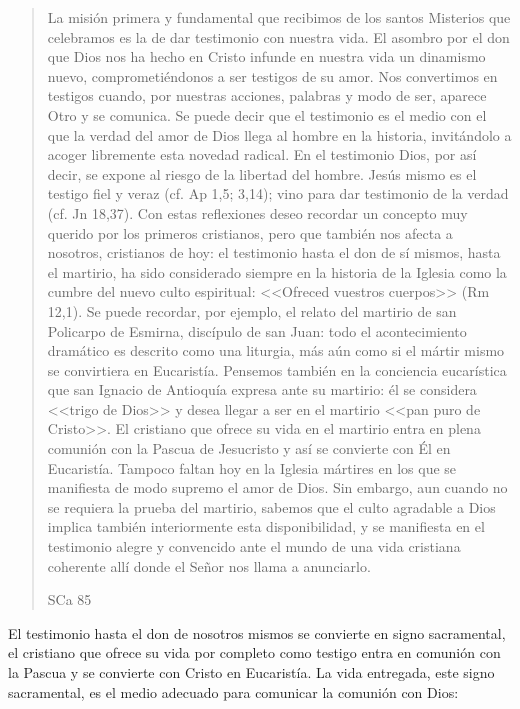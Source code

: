 \blockquote[SCa 85]{La misión primera y fundamental que recibimos de los santos
  Misterios que celebramos es la de dar testimonio con nuestra vida. El asombro
  por el don que Dios nos ha hecho en Cristo infunde en nuestra vida un
  dinamismo nuevo, comprometiéndonos a ser testigos de su amor. Nos convertimos
  en testigos cuando, por nuestras acciones, palabras y modo de ser, aparece
  Otro y se comunica. Se puede decir que el testimonio es el medio con el que la
  verdad del amor de Dios llega al hombre en la historia, invitándolo a acoger
  libremente esta novedad radical. En el testimonio Dios, por así decir, se
  expone al riesgo de la libertad del hombre. Jesús mismo es el testigo fiel y
  veraz (cf. Ap 1,5; 3,14); vino para dar testimonio de la verdad (cf. Jn
  18,37). Con estas reflexiones deseo recordar un concepto muy querido por los
  primeros cristianos, pero que también nos afecta a nosotros, cristianos de
  hoy: el testimonio hasta el don de sí mismos, hasta el martirio, ha sido
  considerado siempre en la historia de la Iglesia como la cumbre del nuevo
  culto espiritual: <<Ofreced vuestros cuerpos>> (Rm 12,1). Se puede recordar,
  por ejemplo, el relato del martirio de san Policarpo de Esmirna, discípulo de
  san Juan: todo el acontecimiento dramático es descrito como una liturgia, más
  aún como si el mártir mismo se convirtiera en Eucaristía. Pensemos también en
  la conciencia eucarística que san Ignacio de Antioquía expresa ante su
  martirio: él se considera <<trigo de Dios>> y desea llegar a ser en el
  martirio <<pan puro de Cristo>>. El cristiano que ofrece su vida en el
  martirio entra en plena comunión con la Pascua de Jesucristo y así se
  convierte con Él en Eucaristía. Tampoco faltan hoy en la Iglesia mártires en
  los que se manifiesta de modo supremo el amor de Dios. Sin embargo, aun cuando
  no se requiera la prueba del martirio, sabemos que el culto agradable a Dios
  implica también interiormente esta disponibilidad, y se manifiesta en el
  testimonio alegre y convencido ante el mundo de una vida cristiana coherente
  allí donde el Señor nos llama a anunciarlo.}
El testimonio hasta el don de nosotros mismos se convierte en signo sacramental,
el cristiano que ofrece su vida por completo como testigo entra en comunión con
la Pascua y se convierte con Cristo en Eucaristía. La vida entregada, este signo
sacramental, es el medio adecuado para comunicar la comunión con Dios:
